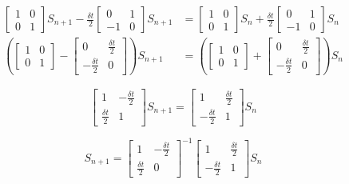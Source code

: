 \documentclass[a4paper,11pt]{report}
\begin{document}
\begin{enumerate}
\begin{itemize}
    \begin{equation*}
    \begin{aligned}
    \begin{bmatrix} 1 & 0 \\ 0 & 1 \end{bmatrix} S_{n+1} - \frac{\delta t}{2} 
    \begin{bmatrix} 0 & 1 \\ -1 & 0 \end{bmatrix} S_{n+1} &= \begin{bmatrix} 
    1 & 0 \\ 0 & 1 \end{bmatrix} S_{n} + \frac{\delta t}{2} \begin{bmatrix} 
    0 & 1 \\ -1 & 0 \end{bmatrix} S_{n} \\
    \left( \begin{bmatrix} 1 & 0 \\ 0 & 1 \end{bmatrix} - \begin{bmatrix} 0 & 
    \frac{\delta t}{2} \\ -\frac{\delta t}{2} & 0 \end{bmatrix} \right) S_{n+1}
    &= \left( \begin{bmatrix} 1 & 0 \\ 0 & 1 \end{bmatrix} + \begin{bmatrix} 
    0 & \frac{\delta t}{2} \\ -\frac{\delta t}{2} & 0 \end{bmatrix} \right) 
    S_{n}
    \end{aligned}
    \end{equation*}

    \begin{equation*}
    \begin{bmatrix} 1 & -\frac{\delta t}{2} \\ \frac{\delta t}{2} & 1 
    \end{bmatrix} S_{n+1} = \begin{bmatrix} 1 & \frac{\delta t}{2} \\ 
    -\frac{\delta t}{2} & 1 \end{bmatrix} S_{n}
    \end{equation*}

    \begin{equation*}
    S_{n+1} = \begin{bmatrix} 1 & -\frac{\delta t}{2} \\ \frac{\delta t}{2} 
    & 0 \end{bmatrix}^{-1} \begin{bmatrix} 1 & \frac{\delta t}{2} \\ 
    -\frac{\delta t}{2} & 1 \end{bmatrix} S_{n}
    \end{equation*}
    

\end{itemize}
\end{enumerate}
\end{document}
